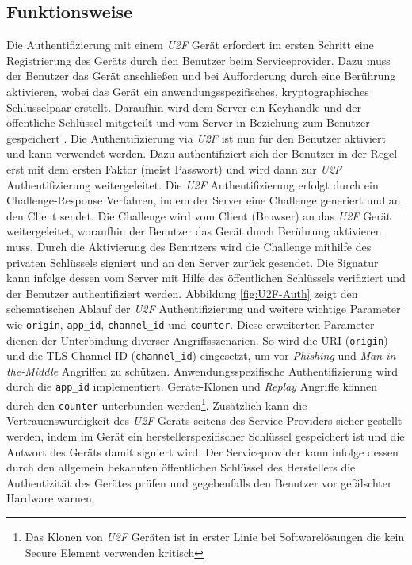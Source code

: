 \documentclass[11pt,a4paper,ngerman]{scrreprt}
\begin{document}
\subsection{Funktionsweise}
Die Authentifizierung mit einem \textit{U2F} Gerät erfordert im ersten Schritt eine Registrierung des Geräts durch den Benutzer beim Serviceprovider. Dazu muss der Benutzer das Gerät anschließen und bei Aufforderung durch eine Berührung aktivieren, wobei das Gerät ein anwendungsspezifisches, kryptographisches Schlüsselpaar erstellt. Daraufhin wird dem Server ein Keyhandle und der öffentliche Schlüssel mitgeteilt und vom Server in Beziehung zum Benutzer gespeichert \cite{u2fv1}. Die Authentifizierung via \textit{U2F} ist nun für den Benutzer aktiviert und kann verwendet werden. Dazu authentifiziert sich der Benutzer in der Regel erst mit dem ersten Faktor (meist Passwort) und wird dann zur \textit{U2F} Authentifizierung weitergeleitet. Die \textit{U2F} Authentifizierung erfolgt durch ein Challenge-Response Verfahren, indem der Server eine Challenge generiert und an den Client sendet. Die Challenge wird vom Client (Browser) an das \textit{U2F} Gerät weitergeleitet, woraufhin der Benutzer das Gerät durch Berührung aktivieren muss. Durch die Aktivierung des Benutzers wird die Challenge mithilfe des privaten Schlüssels signiert und an den Server zurück gesendet. Die Signatur kann infolge dessen vom Server mit Hilfe des öffentlichen Schlüssels verifiziert und der Benutzer authentifiziert werden. Abbildung \ref{fig:U2F-Auth} \cite{u2fTech} zeigt den schematischen Ablauf der \textit{U2F} Authentifizierung und weitere wichtige Parameter wie \texttt{origin}, \texttt{app\_id}, \texttt{channel\_id} und \texttt{counter}. Diese erweiterten Parameter dienen der Unterbindung diverser Angriffsszenarien. So wird die URI (\texttt{origin}) und die TLS Channel ID (\texttt{channel\_id}) eingesetzt, um vor \emph{Phishing} und \textit{Man-in-the-Middle} Angriffen zu schützen. Anwendungsspezifische Authentifizierung wird durch die \texttt{app\_id} implementiert. Geräte-Klonen und \textit{Replay} Angriffe können durch den \texttt{counter} unterbunden werden\footnote{Das Klonen von \textit{U2F} Geräten ist in erster Linie bei Softwarelösungen die kein Secure Element verwenden kritisch}. Zusätzlich kann die Vertrauenswürdigkeit des \textit{U2F} Geräts seitens des Service-Providers sicher gestellt werden, indem im Gerät ein herstellerspezifischer Schlüssel gespeichert ist und die Antwort des Geräts damit signiert wird. Der Serviceprovider kann infolge dessen durch den allgemein bekannten öffentlichen Schlüssel des Herstellers die Authentizität des Gerätes prüfen und gegebenfalls den Benutzer vor gefälschter Hardware warnen.
\end{document}

